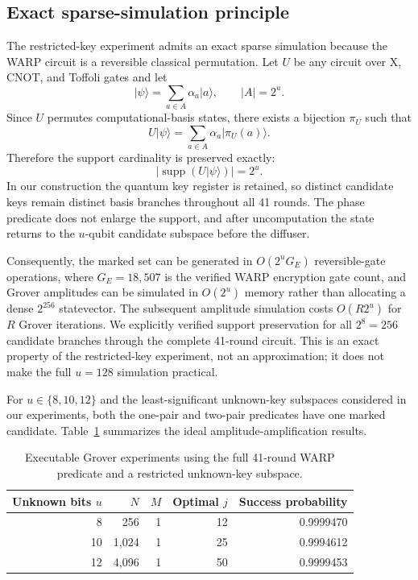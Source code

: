 \documentclass[pdflatex,sn-nature]{sn-jnl}
\providecommand{\ket}[1]{\lvert #1\rangle}
\theoremstyle{thmstyleone}
\theoremstyle{thmstyletwo}
\begin{document}
\subsection{Exact sparse-simulation principle}
The restricted-key experiment admits an exact sparse simulation because the WARP circuit is a reversible classical permutation. Let $U$ be any circuit over X, CNOT, and Toffoli gates and let
\begin{equation}
    \ket{\psi}=\sum_{a\in A}\alpha_a\ket{a},
    \qquad |A|=2^u.
\end{equation}
Since $U$ permutes computational-basis states, there exists a bijection $\pi_U$ such that
\begin{equation}
    U\ket{\psi}=\sum_{a\in A}\alpha_a\ket{\pi_U(a)}.
\end{equation}
Therefore the support cardinality is preserved exactly:
\begin{equation}
    \bigl|\operatorname{supp}(U\ket{\psi})\bigr|=2^u.
    \label{eq:sparse_support}\end{equation}
In our construction the quantum key register is retained, so distinct candidate keys remain distinct basis branches throughout all 41 rounds. The phase predicate does not enlarge the support, and after uncomputation the state returns to the $u$-qubit candidate subspace before the diffuser.

Consequently, the marked set can be generated in $O(2^u G_E)$ reversible-gate operations, where $G_E=18{,}507$ is the verified WARP encryption gate count, and Grover amplitudes can be simulated in $O(2^u)$ memory rather than allocating a dense $2^{256}$ statevector. The subsequent amplitude simulation costs $O(R2^u)$ for $R$ Grover iterations. We explicitly verified support preservation for all $2^8=256$ candidate branches through the complete 41-round circuit. This is an exact property of the restricted-key experiment, not an approximation; it does not make the full $u=128$ simulation practical.

For $u\in\{8,10,12\}$ and the least-significant unknown-key subspaces considered in our experiments, both the one-pair and two-pair predicates have one marked candidate. Table~\ref{tab:exec} summarizes the ideal amplitude-amplification results.

\begin{table}[t]
\centering
\caption{Executable Grover experiments using the full 41-round WARP predicate and a restricted unknown-key subspace.}
\label{tab:exec}
\begin{tabular}{rrrrr}
\toprule
Unknown bits $u$ & $N$ & $M$ & Optimal $j$ & Success probability\\
\midrule
8 & 256 & 1 & 12 & 0.9999470\\
10 & 1,024 & 1 & 25 & 0.9994612\\
12 & 4,096 & 1 & 50 & 0.9999453\\
\bottomrule
\end{tabular}
\end{table}
\end{document}
